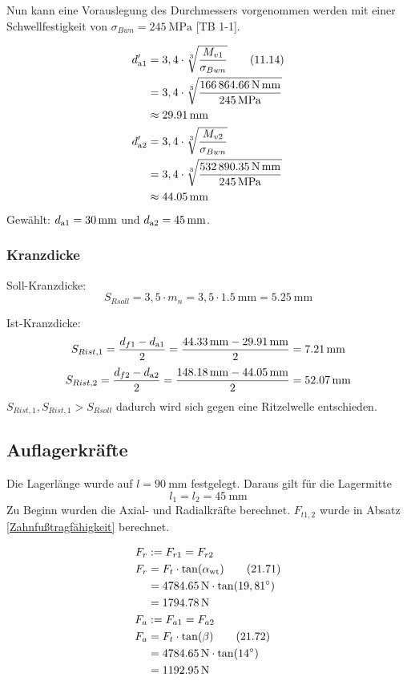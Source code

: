 \documentclass[15pt,a4paper]{article}
\begin{document}
    
     Nun kann eine Vorauslegung des Durchmessers vorgenommen werden mit einer Schwellfestigkeit von $\sigma_{Bwn}=\SI{245}{\mega\pascal}$ [TB 1-1].
     
     \begin{align*}
     	d_{\rm a1}' &=3,4 \cdot \sqrt[3]{\dfrac{M_{v1}}{\sigma_{Bwn}}} \tag{11.14} \\
     	&=3,4 \cdot \sqrt[3]{\dfrac{\SI{166864,66}{\newton\milli\m}}{\SI{245}{\mega\pascal}}}\\
     	&\approx \SI{29,91}{\milli\m}\\
     	d_{\rm a2}'&=3,4 \cdot \sqrt[3]{\dfrac{M_{v2}}{\sigma_{Bwn}}}\\
     	&= 3,4 \cdot \sqrt[3]{\dfrac{\SI{532890,35}{\newton\milli\m}}{\SI{245}{\mega\pascal}}}\\
     	&\approx \SI{44,05}{\milli\m}
     \end{align*}
 	Gewählt: $	d_{\rm a1} = \SI{30}{\milli\m}$ und $	d_{\rm a2} = \SI{45}{\milli\m}$.
     \subsubsection{Kranzdicke}
     Soll-Kranzdicke:
     $$S_{R soll}=3,5 \cdot m_n= 3,5 \cdot  \SI{1,5}{\milli \meter} = \SI{5,25}{\milli \meter}$$
     
     Ist-Kranzdicke:
     $$S_{R ist,1}=\frac{d_{f1}-d_{\rm a1}}{2}=\frac{\SI{44,33}{ \milli \meter}-\SI{29,91}{\milli \meter}}{2}=\SI{7,21}{\milli \meter}$$
     $$S_{R ist,2}=\frac{d_{f2}-d_{\rm a2}}{2}=\frac{\SI{148,18}{ \milli \meter}-\SI{44,05}{\milli \meter}}{2}=\SI{52,07}{\milli \meter}$$
     $S_{R ist,1}, S_{R ist,1} > S_{R soll}$ dadurch wird sich gegen eine Ritzelwelle entschieden. 
     \subsection{Auflagerkräfte}
     Die Lagerlänge wurde auf $l=\SI{90}{\milli\m}$ festgelegt. Daraus gilt für die Lagermitte $$l_1=l_2=\SI{45}{\milli\m}$$ Zu Beginn wurden die Axial- und Radialkräfte berechnet. $F_{t 1,2}$ wurde in Absatz \ref{Zahnfußtragfähigkeit} berechnet.
     
     \begin{align*}
     	F_r &:= F_{r1} = F_{r2} \\
     	F_r&=F_t \cdot \tan(\alpha_{\rm wt})\tag{21.71}\\
     	&=\SI{4784,65}{\newton} \cdot \tan(19,81^\circ)\\
     	&=\SI{1794,78}{\newton}\\
     	F_a &:= F_{a1} = F_{a2} \\
     F_a&=F_t \cdot \tan(\beta)\tag{21.72}\\
     	&=\SI{4784,65}{\newton}\cdot \tan(14^\circ)\\
     	&=\SI{1192,95}{\newton}\\
     \end{align*}
     
\end{document}
